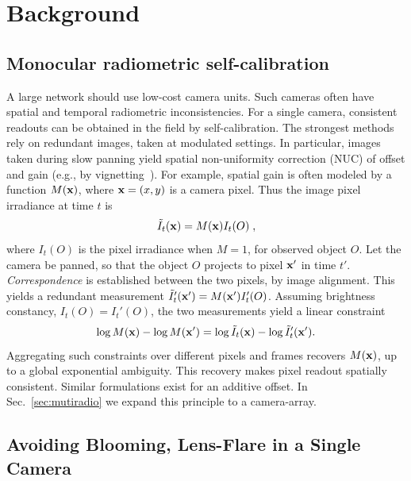 \documentclass[runningheads]{llncs}
\begin{document}
\section{Background}
\label{sec:theory}


\subsection{Monocular radiometric self-calibration}
\label{sec:Signelradio}

A large network should use low-cost camera units. Such cameras often have spatial and temporal radiometric inconsistencies. For a single camera, consistent readouts can be obtained in the field by self-calibration. The strongest methods rely on redundant images, taken at modulated settings. In particular, images taken during slow panning yield spatial non-uniformity correction (NUC) of offset and gain (e.g., by vignetting~\cite{LitvinovCVPR05,Kang2000}). For example, spatial gain is often modeled by a function $M({\bf x})$, where \mbox{${\bf x}=(x,y)$} is a camera pixel. Thus the image pixel irradiance at time $t$ is
\begin{equation}
 \tilde{I}_t({\bf x}) = M({\bf x})I_t(O) \;,
 \label{eq:tilde_I}
\end{equation}
where $I_t(O)$ is the pixel irradiance when $M=1$, for observed object $O$. Let the camera be panned, so that the object $O$ projects to pixel ${\bf x}'$ in time $t'$.
{\em Correspondence} is established between the two pixels, by image alignment. This yields a redundant measurement $\tilde{I}_t'({\bf x}') = M({\bf x}')I_t'(O)$. Assuming brightness constancy, $I_t(O)=I_t'(O)$, the two measurements yield a linear constraint
\begin{equation}
 \log M({\bf x})- \log M({\bf x}')=\log \tilde{I}_t({\bf x})-\log \tilde{I}_t'({\bf x}').
 \label{eq:logM}
\end{equation}
Aggregating such constraints over different pixels and frames recovers $M({\bf x})$, up to a global exponential ambiguity. This recovery makes pixel readout spatially consistent. Similar formulations exist for an additive offset. In Sec.~\ref{sec:mutiradio} we expand this principle to a camera-array.



\subsection{Avoiding Blooming, Lens-Flare in a Single Camera}
\label{sec:Signelflare}
\end{document}
